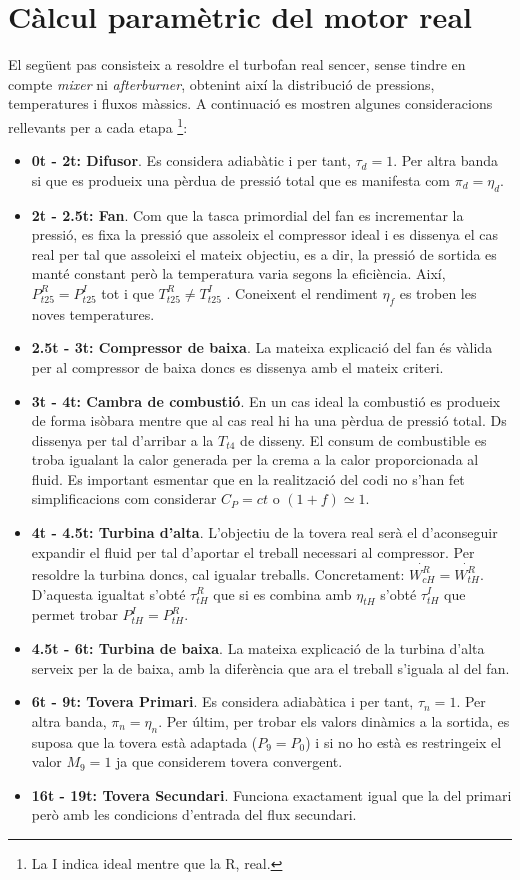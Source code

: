 \section{Càlcul paramètric del motor real}
El següent pas consisteix a resoldre el turbofan real sencer, sense tindre en compte \textit{mixer} ni \textit{afterburner}, obtenint així la distribució de pressions, temperatures i fluxos màssics. A continuació es mostren algunes consideracions rellevants per a cada etapa \footnote{La I indica ideal mentre que la R, real.}:
\begin{itemize}
\item \textbf{0t - 2t: Difusor}. Es considera adiabàtic i per tant, $\tau_d = 1$. Per altra banda si que es produeix una pèrdua de pressió total que es manifesta com $\pi_d = \eta_d$.
\item \textbf{2t - 2.5t: Fan}. Com que la tasca primordial del fan es incrementar la pressió, es fixa la pressió que assoleix el compressor ideal i es dissenya el cas real per tal que assoleixi el mateix objectiu, es a dir, la pressió de sortida es manté constant però la temperatura varia segons la eficiència. Així, $P_{t25}^R = P_{t25}^I$ tot i que $T_{t25}^R \neq T_{t25}^I$ . Coneixent el rendiment $\eta_f$ es troben les noves temperatures.
\item \textbf{2.5t - 3t: Compressor de baixa}. La mateixa explicació del fan és vàlida per al compressor de baixa doncs es dissenya amb el mateix criteri.
\item \textbf{3t - 4t: Cambra de combustió}. En un cas ideal la combustió es produeix de forma isòbara mentre que al cas real hi ha una pèrdua de pressió total. Ds dissenya per tal d'arribar a la $T_{t4}$ de disseny. El consum de combustible es troba igualant la calor generada per la crema a la calor proporcionada al fluid. Es important esmentar que en la realització del codi no s'han fet simplificacions com considerar $C_P=ct$ o $(1+f)\simeq1$.
\item \textbf{4t - 4.5t: Turbina d'alta}. L'objectiu de la tovera real serà el d'aconseguir expandir el fluid per tal d'aportar el treball necessari al compressor. Per resoldre la turbina doncs, cal igualar treballs. Concretament: $\dot{W_{cH}^R} = \dot{W_{tH}^R} $. D'aquesta igualtat s'obté $\tau_{tH}^R$ que si es combina amb $\eta_{tH}$ s'obté $\tau_{tH}^I$ que permet trobar  $P_{tH}^{I} = P_{tH}^{R}$.
\item \textbf{4.5t - 6t: Turbina de baixa}. La mateixa explicació de la turbina d'alta serveix per la de baixa, amb la diferència que ara el treball s'iguala al del fan.
\item \textbf{6t - 9t: Tovera Primari}. Es considera adiabàtica i per tant, $\tau_n = 1$. Per altra banda, $\pi_n = \eta_n$. Per últim, per trobar els valors dinàmics a la sortida, es suposa que la tovera està adaptada ($P_9 = P_0$) i si no ho està es restringeix el valor $M_9=1$ ja que considerem tovera convergent.
\item \textbf{16t - 19t: Tovera Secundari}. Funciona exactament igual que la del primari però amb les condicions d'entrada del flux secundari.
\end{itemize}
